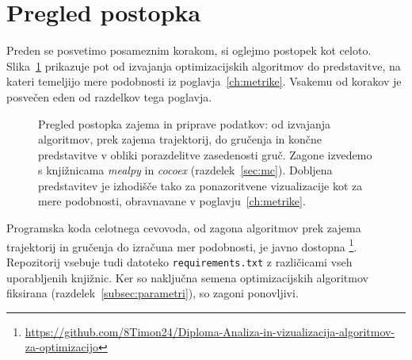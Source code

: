 \documentclass[a4paper, 12pt]{book}
\begin{document}
\section{Pregled postopka}
\label{sec:pregled-postopka}

Preden se posvetimo posameznim korakom, si oglejmo postopek kot celoto.
Slika~\ref{fig:pipeline} prikazuje pot od izvajanja optimizacijskih
algoritmov do pred\-sta\-vit\-ve, na kateri temeljijo mere podobnosti iz
poglavja~\ref{ch:metrike}. Vsakemu od korakov je posvečen eden od razdelkov
tega poglavja.

\begin{figure}[ht]
\centering
{}
\caption{Pregled postopka zajema in priprave podatkov: od izvajanja
algoritmov, prek zajema trajektorij, do gručenja in končne predstavitve v
obliki porazdelitve zasedenosti gruč. Zagone izvedemo s knjižnicama \emph{mealpy}
in \emph{cocoex} (razdelek~\ref{sec:mc}). Dobljena predstavitev je izhodišče tako
za ponazoritvene vizualizacije kot za mere podobnosti, obravnavane v
poglavju~\ref{ch:metrike}.}
\label{fig:pipeline}
\end{figure}


Programska koda celotnega cevovoda, od zagona algoritmov prek zajema
trajektorij in gručenja do izračuna mer podobnosti, je javno dostopna%
\footnote{ \url{https://github.com/8Timon24/Diploma-Analiza-in-vizualizacija-algoritmov-za-optimizacijo}
}.
Repozitorij vsebuje tudi datoteko \texttt{requirements.txt} z različicami
vseh uporabljenih knjižnic. Ker so naključna semena optimizacijskih
algoritmov fiksirana (razdelek~\ref{subsec:parametri}), so zagoni ponovljivi.
\end{document}
